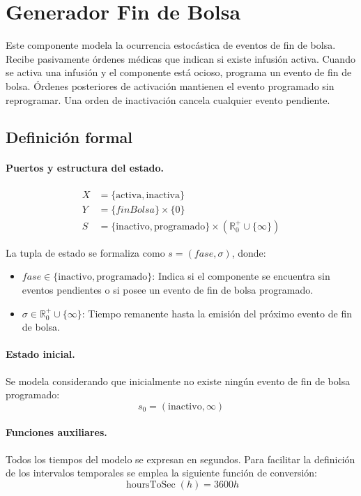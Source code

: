 \section{Generador Fin de Bolsa}

Este componente modela la ocurrencia estocástica de eventos de fin de bolsa. Recibe pasivamente órdenes médicas que indican si existe infusión activa. Cuando se activa una infusión y el componente está ocioso, programa un evento de fin de bolsa. Órdenes posteriores de activación mantienen el evento programado sin reprogramar. Una orden de inactivación cancela cualquier evento pendiente.

\subsection{Definición formal}

\paragraph{Puertos y estructura del estado.}
\begin{align*}
X &= \{\text{activa}, \text{inactiva}\} \\[4pt]
Y &= \{\mathit{finBolsa}\} \times \{0\} \\[4pt]
S &= \{\text{inactivo}, \text{programado}\} \times (\mathbb{R}_0^+ \cup \{\infty\})
\end{align*}

La tupla de estado se formaliza como $s = (\mathit{fase}, \sigma)$, donde:
\begin{itemize}
    \item $\mathit{fase} \in \{\text{inactivo}, \text{programado}\}$: Indica si el componente se encuentra sin eventos pendientes o si posee un evento de fin de bolsa programado.
    \item $\sigma \in \mathbb{R}_0^+ \cup \{\infty\}$: Tiempo remanente hasta la emisión del próximo evento de fin de bolsa.
\end{itemize}

\paragraph{Estado inicial.} Se modela considerando que inicialmente no existe ningún evento de fin de bolsa programado:
\[
s_0 = (\text{inactivo}, \infty)
\]

\paragraph{Funciones auxiliares.}
Todos los tiempos del modelo se expresan en segundos. Para facilitar la definición de los intervalos temporales se emplea la siguiente función de conversión:
\[
\operatorname{hoursToSec}(h) = 3600h
\]

